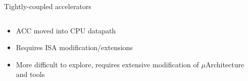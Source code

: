 \documentclass[dvipsnames]{beamer}
\begin{document}
\begin{frame}{Tightly-coupled accelerators}
  \begin{columns}[T]
    \begin{column}{0.5\textwidth}
      \begin{itemize}
        \item ACC moved into CPU datapath
        \item Requires ISA modification/extensions
        \item More difficult to explore, requires extensive modification of
          $\mu$Architecture and tools
      \end{itemize}
    \end{column}
    \hfill
    \begin{column}{0.5\textwidth}
    \end{column}
  \end{columns}
\end{frame}
\end{document}
